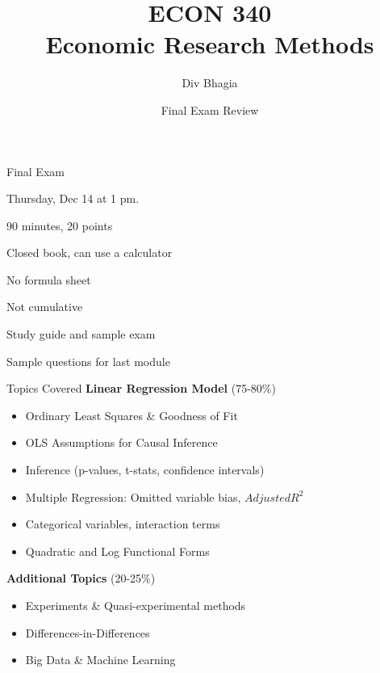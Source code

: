 \documentclass{./../div_teaching_slides}
\begin{document}
\title{ECON 340 \\ Economic Research Methods}
\author{Div Bhagia}
\date{Final Exam Review}

\begin{frame}
\maketitle
\end{frame}

\begin{frame}{Final Exam}
\begin{witemize}
 \item Thursday, Dec 14 at 1 pm.
  \item 90 minutes, 20 points
  \item Closed book, can use a calculator
  \item No formula sheet 
  \item Not cumulative 
  \item Study guide and sample exam 
  \item Sample questions for last module
\end{witemize}
\end{frame}

\begin{frame}{Topics Covered}
\vspace{-0.5em}
\textbf{Linear Regression Model} (75-80\%) \vspace{0.1em}
\begin{itemize}
  \item Ordinary Least Squares \& Goodness of Fit
  \item OLS Assumptions for Causal Inference
  \item Inference (p-values, t-stats, confidence intervals)
  \item Multiple Regression: Omitted variable bias, $Adjusted R^2$
  \item Categorical variables, interaction terms
  \item Quadratic and Log Functional Forms
\end{itemize}
\vspace{0.5em}
\textbf{Additional Topics} (20-25\%)\vspace{0.1em}
\begin{itemize}
  \item Experiments \& Quasi-experimental methods
  \item Differences-in-Differences
  \item Big Data \& Machine Learning
\end{itemize}
\end{frame}
\end{document}
